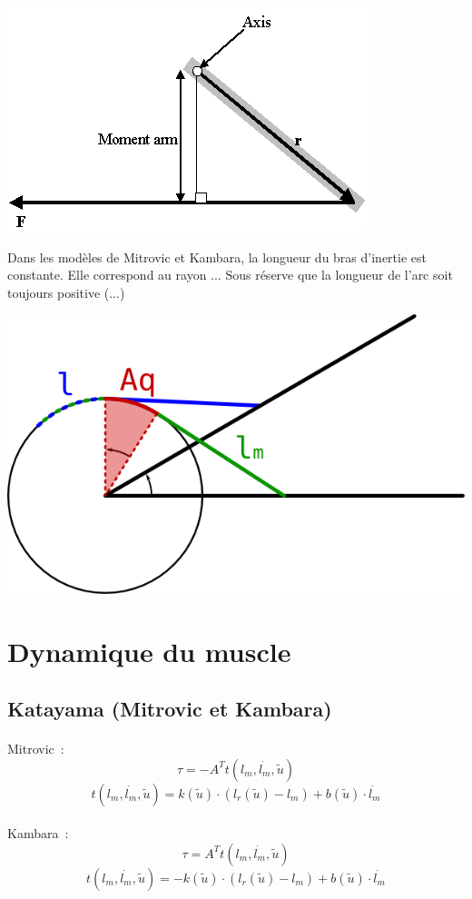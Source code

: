 \documentclass[pdftex,a4paper,11pt]{article}
\numberwithin{equation}{subsection}
\begin{document}
\begin{center}
        \includegraphics[width=.50\linewidth]{fig/moment_arm}
\end{center}

Dans les modèles de Mitrovic et Kambara, la longueur du bras d'inertie est constante. Elle correspond au rayon ...
Sous réserve que la longueur de l'arc soit toujours positive (...)

\begin{center}
        \includegraphics[width=.50\linewidth]{fig/muscle_length}
\end{center}


\section{Dynamique du muscle}

\subsection{Katayama (Mitrovic et Kambara)}

\paragraph{}
Mitrovic~:
\[ \tau = -A^T t(l_m, \dot{l_m}, \tilde{u}) \]
\[ t(l_m, \dot{l_m}, \tilde{u}) = k(\tilde{u}) \cdot (l_r(\tilde{u}) - l_m) + b(\tilde{u}) \cdot \dot{l_m} \]

\paragraph{}
Kambara~:
\[ \tau = A^T t(l_m, \dot{l_m}, \tilde{u}) \]
\[ t(l_m, \dot{l_m}, \tilde{u}) = -k(\tilde{u}) \cdot (l_r(\tilde{u}) - l_m) + b(\tilde{u}) \cdot \dot{l_m} \]
\end{document}
